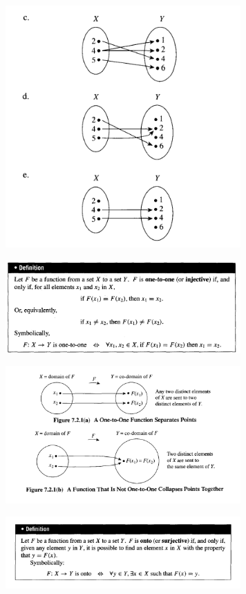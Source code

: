 \documentclass{article}
\begin{document}
\begin{figure}
\centering
\includegraphics[width=90mm]{4}
\end{figure}

\begin{figure}
\centering
\includegraphics[width=90mm]{5}
\end{figure}

\begin{figure}
\centering
\includegraphics[width=90mm]{6}
\end{figure}

\begin{figure}
\centering
\includegraphics[width=90mm]{7}
\end{figure}
\end{document}
